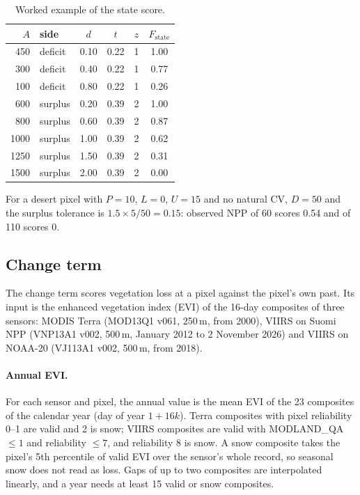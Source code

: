 \documentclass[11pt,a4paper]{article}
\begin{document}
\begin{table}[H]
\centering\small
\caption{Worked example of the state score.}
\begin{tabular}{rlcccc}
\toprule
$A$ & side & $d$ & $t$ & $z$ & $F_{\text{state}}$ \\
\midrule
450 & deficit & 0.10 & 0.22 & 1 & 1.00 \\
300 & deficit & 0.40 & 0.22 & 1 & 0.77 \\
100 & deficit & 0.80 & 0.22 & 1 & 0.26 \\
600 & surplus & 0.20 & 0.39 & 2 & 1.00 \\
800 & surplus & 0.60 & 0.39 & 2 & 0.87 \\
1000 & surplus & 1.00 & 0.39 & 2 & 0.62 \\
1250 & surplus & 1.50 & 0.39 & 2 & 0.31 \\
1500 & surplus & 2.00 & 0.39 & 2 & 0.00 \\
\bottomrule
\end{tabular}
\end{table}

\noindent For a desert pixel with $P = 10$, $L = 0$, $U = 15$ and no natural CV, $D = 50$ and the
surplus tolerance is $1.5 \times 5/50 = 0.15$: observed NPP of 60 scores 0.54 and of 110 scores 0.

\subsection{Change term}
\label{sec:change}

The change term scores vegetation loss at a pixel against the pixel's own past. Its input is the
enhanced vegetation index (EVI) of the 16-day composites of three sensors: MODIS Terra
(MOD13Q1 v061, 250\,m, from 2000), VIIRS on Suomi NPP (VNP13A1 v002, 500\,m, January 2012 to
2 November 2026) and VIIRS on NOAA-20 (VJ113A1 v002, 500\,m, from 2018).

\paragraph{Annual EVI.} For each sensor and pixel, the annual value is the mean EVI of the 23
composites of the calendar year (day of year $1 + 16k$). Terra composites with pixel reliability
0--1 are valid and 2 is snow; VIIRS composites are valid with MODLAND\_QA $\le 1$ and reliability
$\le 7$, and reliability 8 is snow. A snow composite takes the pixel's 5th percentile of valid EVI
over the sensor's whole record, so seasonal snow does not read as loss. Gaps of up to two
composites are interpolated linearly, and a year needs at least 15 valid or snow composites.
\end{document}
